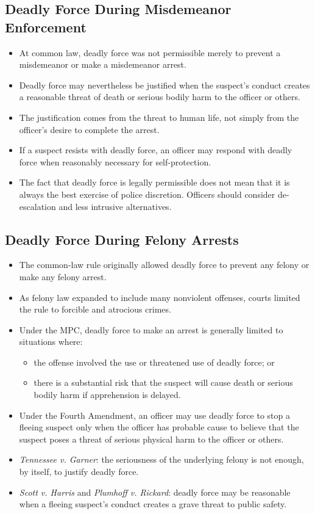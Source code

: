 \documentclass[11pt]{tex/lawoutline}
\begin{document}
\subsection{Deadly Force During Misdemeanor Enforcement}
{
\begin{itemize}
    \item At common law, deadly force was not permissible merely to prevent a misdemeanor or make a misdemeanor arrest.
    \item Deadly force may nevertheless be justified when the suspect's conduct creates a reasonable threat of death or serious bodily harm to the officer or others.
    \item The justification comes from the threat to human life, not simply from the officer's desire to complete the arrest.
    \item If a suspect resists with deadly force, an officer may respond with deadly force when reasonably necessary for self-protection.
    \item The fact that deadly force is legally permissible does not mean that it is always the best exercise of police discretion. Officers should consider de-escalation and less intrusive alternatives.
\end{itemize}
}

\subsection{Deadly Force During Felony Arrests}
{
\begin{itemize}
    \item The common-law rule originally allowed deadly force to prevent any felony or make any felony arrest.
    \item As felony law expanded to include many nonviolent offenses, courts limited the rule to forcible and atrocious crimes.
    \item Under the MPC, deadly force to make an arrest is generally limited to situations where:
    \begin{itemize}
        \item the offense involved the use or threatened use of deadly force; or
        \item there is a substantial risk that the suspect will cause death or serious bodily harm if apprehension is delayed.
    \end{itemize}
    \item Under the Fourth Amendment, an officer may use deadly force to stop a fleeing suspect only when the officer has probable cause to believe that the suspect poses a threat of serious physical harm to the officer or others.
    \item \textit{Tennessee v. Garner}: the seriousness of the underlying felony is not enough, by itself, to justify deadly force.
    \item \textit{Scott v. Harris} and \textit{Plumhoff v. Rickard}: deadly force may be reasonable when a fleeing suspect's conduct creates a grave threat to public safety.
\end{itemize}
}
\end{document}
